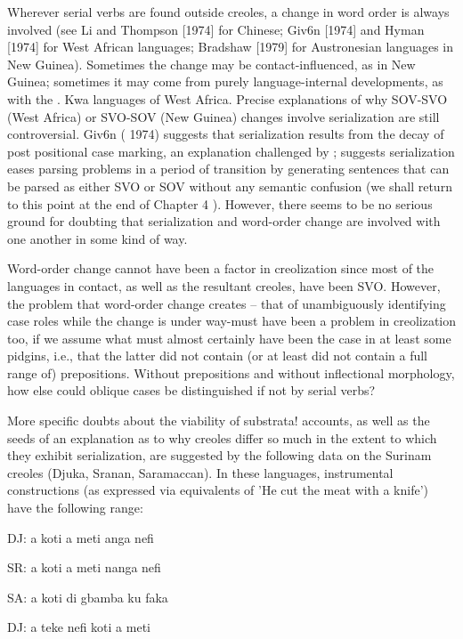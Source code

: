 Wherever serial verbs are found outside creoles, a change in word order is always involved (see Li and Thompson [1974] for Chinese; Giv6n [1974] and Hyman [1974] for West African languages; Brad\-shaw [1979] for Austronesian languages in New Guinea). Sometimes the change may be contact-influenced, as in New Guinea; sometimes it may come from purely language-internal developments, as with the . Kwa languages of West Africa. Precise explanations of why SOV-SVO (West Africa) or SVO-SOV (New Guinea) changes involve serialization are still controversial. Giv6n ( 1974) suggests that serialization results from the decay of post positional case marking, an explanation chal\-lenged by \citet{Hyman1974}; \citet{Bradshaw1979} suggests serialization eases parsing problems in a period of transition by generating sentences that can be parsed as either SVO or SOV without any semantic confu\-sion (we shall return to this point at the end of Chapter 4 ). However, there seems to be no serious ground for doubting that serialization and word-order change are involved with one another in some kind of way.

Word-order change cannot have been a factor in creolization since most of the languages in contact, as well as the resultant creoles, have been SVO. However, the problem that word-order change creates --
that of unambiguously identifying case roles while the change is under way-must have been a problem in creolization too, if we assume what must almost certainly have been the case in at least some pidgins, i.e., that the latter did not contain (or at least did not contain a full range of) prepositions. Without prepositions and without inflectional morphology, how else could oblique cases be distinguished if not by serial verbs?

More specific doubts about the viability of substrata! accounts, as well as the seeds of an explanation as to why creoles differ so much in the extent to which they exhibit serialization, are suggested by the following data on the Surinam creoles (Djuka, Sranan, Saramaccan). In these languages, instrumental constructions (as expressed via equiva\-lents of 'He cut the meat with a knife') have the following range:

\ea\label{ex:2:228}
 DJ: a koti a meti anga nefi
\z

\ea\label{ex:2:229}
 SR: a koti a meti nanga nefi
\z

\ea\label{ex:2:230}
 SA: a koti di gbamba ku faka
\z

\ea\label{ex:2:231}
 DJ: a teke nefi koti a meti
\z


